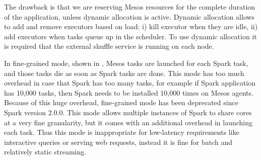 The drawback is that we are reserving Mesos resources for the complete duration of the application, unless dynamic allocation is active. Dynamic allocation allows to add and remove executors based on load: i) kill executor when they are idle, ii) add executors when tasks
queue up in the scheduler. To use dynamic allocation it is required that the external shuffle service is running on each node.

In fine-grained mode, shown in , Mesos tasks are launched for each Spark task, and those tasks die as soon as Spark tasks are done. This mode has too much overhead in case that Spark has too many tasks, for example if Spark application has 10,000 tasks, then Spark needs to be installed 10,000 times on Mesos agents. Because
of this huge overhead, fine-grained mode has been deprecated since Spark version 2.0.0.         This mode allows multiple instances of Spark to share cores at a very fine granularity, but it comes with an additional  overhead in launching each task. Thus this mode is inappropriate
for low-latency requirements like interactive queries or serving web requests, instead it is fine for batch and relatively static streaming. 

